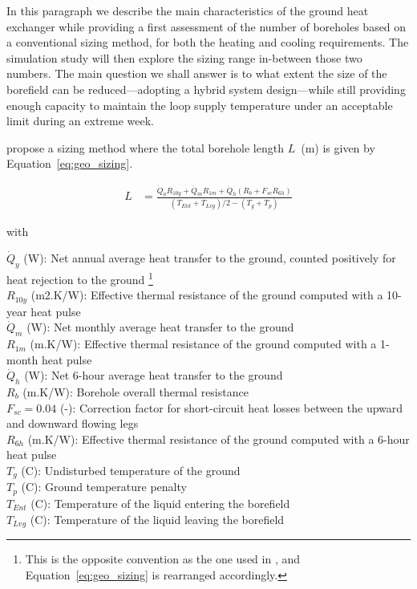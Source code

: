 In this paragraph we describe the main characteristics of the ground heat exchanger while providing a first assessment of the number of boreholes based on a conventional sizing method, for both the heating and cooling requirements.
The simulation study will then explore the sizing range in-between those two numbers.
The main question we shall answer is to what extent the size of the borefield can be reduced---adopting a hybrid system design---while still providing enough capacity to maintain the loop supply temperature under an acceptable limit during an extreme week.

\cite{Kavanaugh2014} propose a sizing method where the total borehole length $L$~(m) is given by Equation~\ref{eq:geo_sizing}.

\begin{align}
    \label{eq:geo_sizing}
    L &= \frac{\dot{Q}_a R_{10y} + \dot{Q}_m R_{1m} + \dot{Q}_h \left( R_b + F_{sc} R_{6h} \right)}{\left( T_{Ent} + T_{Lvg} \right) / 2 - \left( T_g + T_p \right)}
\end{align}

with

\begin{avec}
    $\dot{Q}_y$ (W): Net annual average heat transfer to the ground, counted positively for heat rejection to the ground%
    \footnote{This is the opposite convention as the one used in \cite{Kavanaugh2014}, and Equation~\ref{eq:geo_sizing} is rearranged accordingly.}\\
    $R_{10y}$ (m2.K/W): Effective thermal resistance of the ground computed with a 10-year heat pulse \\
    $\dot{Q}_m$ (W): Net monthly average heat transfer to the ground\\
    $R_{1m}$ (m.K/W): Effective thermal resistance of the ground computed with a 1-month heat pulse \\
    $\dot{Q}_h$ (W): Net 6-hour average heat transfer to the ground\\
    $R_b$ (m.K/W): Borehole overall thermal resistance \\
    $F_{sc} = 0.04$ (-): Correction factor for short-circuit heat losses between the upward and downward flowing legs\\
    $R_{6h}$ (m.K/W): Effective thermal resistance of the ground computed with a 6-hour heat pulse \\
    $T_g$ (C): Undisturbed temperature of the ground \\
    $T_p$ (C): Ground temperature penalty \\
    $T_{Ent}$ (C): Temperature of the liquid entering the borefield \\
    $T_{Lvg}$ (C): Temperature of the liquid leaving the borefield \\
\end{avec}

